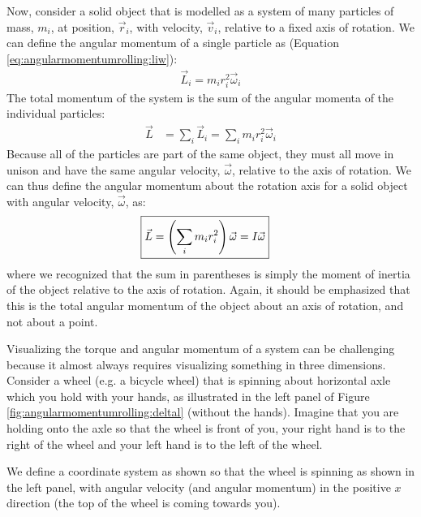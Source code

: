 Now, consider a solid object that is modelled as a system of many particles of mass, $m_i$, at position, $\vec r_i$, with velocity, $\vec v_i$, relative to a fixed axis of rotation. We can define the angular momentum of a single particle as (Equation \ref{eq:angularmomentumrolling:liw}):
\begin{align*}
\vec L_i = m_i r_i^2 \vec \omega_i
\end{align*}
The total momentum of the system is the sum of the angular momenta of the individual particles:
\begin{align*}
\vec L &= \sum_i\vec L_i = \sum_i  m_i r_i^2 \vec \omega_i
\end{align*}
Because all of the particles are part of the same object, they must all move in unison and have the same angular velocity, $\vec\omega$, relative to the axis of rotation. We can thus define the angular momentum about the rotation axis for a solid object with angular velocity, $\vec\omega$, as:
\begin{align}
\Aboxed{\vec L &= \left(\sum_i  m_i r_i^2\right) \vec \omega = I\vec\omega}
\end{align}
where we recognized that the sum in parentheses is simply the moment of inertia of the object relative to the axis of rotation. Again, it should be emphasized that this is the total angular momentum of the object about an axis of rotation, and not about a point. 

Visualizing the torque and angular momentum of a system can be challenging because it almost always requires visualizing something in three dimensions. Consider a wheel (e.g. a bicycle wheel) that is spinning about horizontal axle which you hold with your hands, as illustrated in the left panel of Figure \ref{fig:angularmomentumrolling:deltal} (without the hands). Imagine that you are holding onto the axle so that the wheel is front of you, your right hand is to the right of the wheel and your left hand is to the left of the wheel.

We define a coordinate system as shown so that the wheel is spinning as shown in the left panel, with angular velocity (and angular momentum) in the positive $x$ direction (the top of the wheel is coming towards you).

